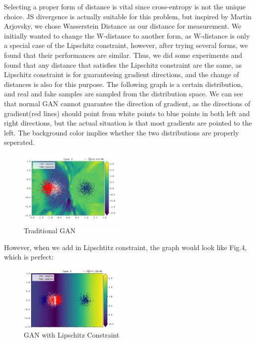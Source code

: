 \documentclass{acmtog} %
\begin{document}
Selecting a proper form of distance is vital since cross-entropy is not the unique choice. JS divergence is actually suitable for this problem, but inspired by Martin Arjovsky, we chose Wasserstein Distance as our distance for measurement. We initially wanted to change the W-distance to another form, as W-distance is only a special case of the Lipschitz constraint, however, after trying several forms, we found that their performances are similar. Thus, we did some experiments and found that any distance that satisfies the Lipschitz constraint are the same, as Lipschitz constraint is for guaranteeing gradient directions, and the change of distances is also for this purpose. The following graph is a certain distribution, and real and fake samples are sampled from the distribution space. We can see that normal GAN cannot guarantee the direction of gradient, as the directions of gradient(red lines) should point from white points to blue points in both left and right directions, but the actual situation is that most gradients are pointed to the left. The background color implies whether the two distributions are properly seperated.

\begin{figure}[h]
   \begin{center}
      \includegraphics[width=0.45\textwidth]{lip1.png}
   \end{center}
\caption{Traditional GAN}
\label{RTL}
\end{figure}

However, when we add in Lipschtitz constraint, the graph would look like Fig.4, which is perfect:
\begin{figure}[h]
   \begin{center}
      \includegraphics[width=0.45\textwidth]{lip2.png}
   \end{center}
\caption{GAN with Lipschitz Constraint}
\label{RTL}
\end{figure}
\end{document}

